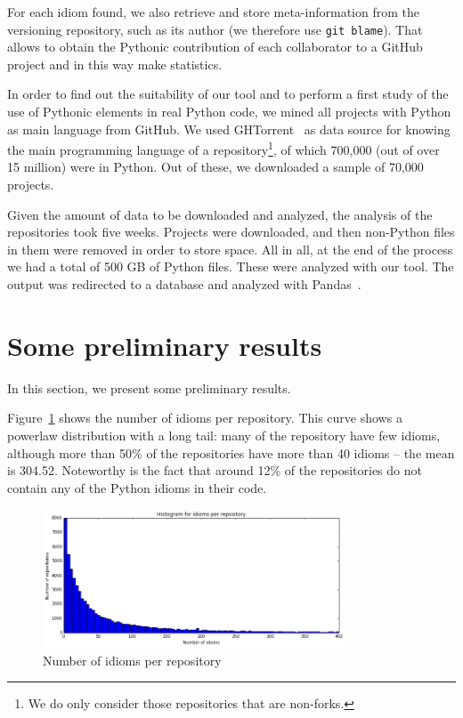 \documentclass[conference]{IEEEtran}
\begin{document}
For each idiom found, we also retrieve and store meta-information from the versioning repository, such as its author (we therefore use \texttt{git blame}). That allows to obtain the Pythonic contribution of each collaborator to a GitHub project and in this way make statistics.

In order to find out the suitability of our tool and to perform a first study of the use of Pythonic elements in real Python code, we mined all projects with Python as main language from GitHub. We used GHTorrent~\cite{gousios2012ghtorrent} as data source for knowing the main programming language of a repository\footnote{We do only consider those repositories that are non-forks.}, of which 700,000 (out of over 15 million) were in Python. Out of these, we downloaded a sample of 70,000 projects.

Given the amount of data to be downloaded and analyzed, the analysis of the repositories took five weeks. Projects were downloaded, and then non-Python files in them were removed in order to store space. All in all, at the end of the process we had a total of 500 GB of Python files. These were analyzed with our tool. The output was redirected to a database and analyzed with Pandas~\cite{mckinney2012python}.

\section{Some preliminary results}

In this section, we present some preliminary results. 

Figure~\ref{fig:idioms_per_repository} shows the number of idioms per repository. This curve shows a powerlaw distribution with a long tail: many of the repository have few idioms, although more than 50\% of the repositories have more than 40 idioms -- the mean is 304.52. Noteworthy is the fact that around 12\% of the repositories do not contain any of the Python idioms in their code.

\begin{figure}[ht]
\centering  
\includegraphics[width=90mm]{img/idioms_per_repository.png}
\caption{Number of idioms per repository}
\label{fig:idioms_per_repository}
\end{figure}
\end{document}

